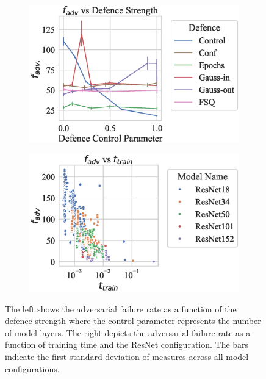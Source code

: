 \begin{figure}[!h]
    \centering
    \begin{subfigure}
        \centering
        \includegraphics[width=.4\textwidth]{mnist/def_param_vs_adv_failure_rate.eps}
    \end{subfigure}
    \begin{subfigure}
        \centering
        \includegraphics[width=.4\textwidth]{mnist/adv_failure_rate_vs_train_time.eps}
    \end{subfigure}
    \caption{The left shows the adversarial failure rate as a function of the defence strength where the control parameter represents the number of model layers. The right depicts the adversarial failure rate as a function of training time and the ResNet configuration. The bars indicate the first standard deviation of measures across all model configurations.}
    \label{fig:mnist_failure_rate}
\end{figure}

